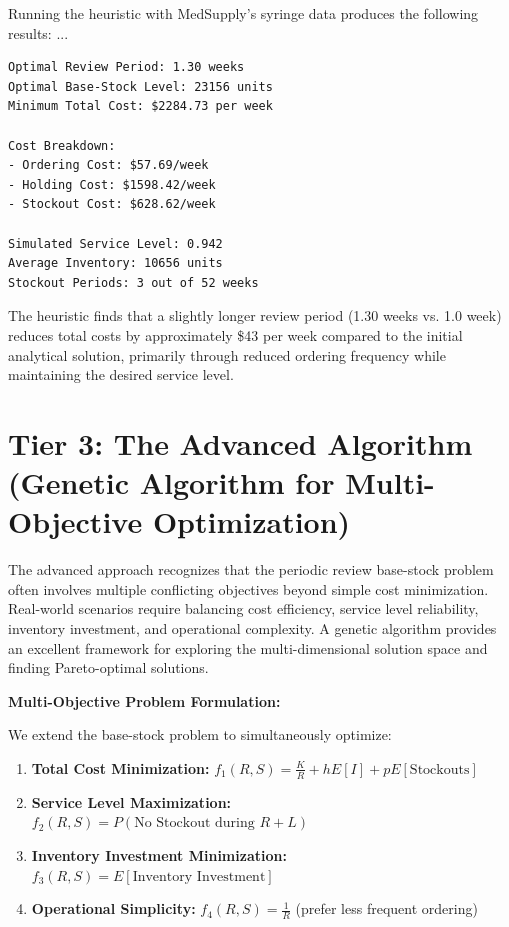 \documentclass{article}
\begin{document}
Running the heuristic with MedSupply's syringe data produces the following results:
{{ ... }}

\begin{verbatim}
Optimal Review Period: 1.30 weeks
Optimal Base-Stock Level: 23156 units  
Minimum Total Cost: $2284.73 per week

Cost Breakdown:
- Ordering Cost: $57.69/week
- Holding Cost: $1598.42/week  
- Stockout Cost: $628.62/week

Simulated Service Level: 0.942
Average Inventory: 10656 units
Stockout Periods: 3 out of 52 weeks
\end{verbatim}

The heuristic finds that a slightly longer review period (1.30 weeks vs. 1.0 week) reduces total costs by approximately \$43 per week compared to the initial analytical solution, primarily through reduced ordering frequency while maintaining the desired service level.

\section{Tier 3: The Advanced Algorithm (Genetic Algorithm for Multi-Objective Optimization)}

The advanced approach recognizes that the periodic review base-stock problem often involves multiple conflicting objectives beyond simple cost minimization. Real-world scenarios require balancing cost efficiency, service level reliability, inventory investment, and operational complexity. A genetic algorithm provides an excellent framework for exploring the multi-dimensional solution space and finding Pareto-optimal solutions.

\textbf{Multi-Objective Problem Formulation:}

We extend the base-stock problem to simultaneously optimize:
\begin{enumerate}
\item \textbf{Total Cost Minimization:} $f_1(R,S) = \frac{K}{R} + hE[I] + pE[\text{Stockouts}]$
\item \textbf{Service Level Maximization:} $f_2(R,S) = P(\text{No Stockout during } R+L)$
\item \textbf{Inventory Investment Minimization:} $f_3(R,S) = E[\text{Inventory Investment}]$
\item \textbf{Operational Simplicity:} $f_4(R,S) = \frac{1}{R}$ (prefer less frequent ordering)
\end{enumerate}
\end{document}
